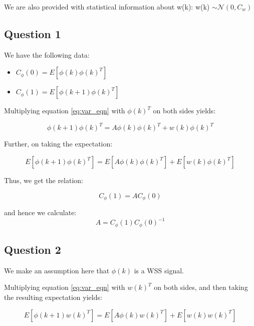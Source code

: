 \documentclass[12pt]{report}
\begin{document}
We are also provided with statistical information about w(k): w(k) $\sim \mathcal{N}(0, C_{w})$

\subsection*{Question 1}

We have the following data:

\begin{itemize}
	\item $C_{\phi}(0) = E\left[\phi(k)\phi(k)^{T}\right]$
	\item $C_{\phi}(1) = E\left[\phi(k+1)\phi(k)^{T}\right]$
\end{itemize}

Multiplying equation \ref{eq:var_eqn} with $\phi(k)^{T}$ on both sides yields:

\begin{equation*}
\phi(k+1)\phi(k)^{T} = A\phi(k)\phi(k)^{T} + w(k)\phi(k)^{T}
\end{equation*}

Further, on taking the expectation:

\begin{equation*}
E\left[\phi(k+1)\phi(k)^{T}\right] = E\left[A\phi(k)\phi(k)^{T}\right] + E\left[w(k)\phi(k)^{T}\right]
\end{equation*}

Thus, we get the relation:

\begin{equation*}
	C_{\phi}(1) = AC_{\phi}(0)
\end{equation*}

and hence we calculate:
\begin{equation*}
	A = C_{\phi}(1)C_{\phi}(0)^{-1}
\end{equation*}


\subsection*{Question 2}

We make an assumption here that $\phi(k)$ is a WSS signal.

Multiplying equation \ref{eq:var_eqn} with $w(k)^{T}$ on both sides, and then taking the resulting expectation yields:

\begin{equation*}
E\left[\phi(k+1)w(k)^{T}\right] = E\left[A\phi(k)w(k)^{T}\right] + E\left[w(k)w(k)^{T}\right]
\end{equation*} 
\end{document}
